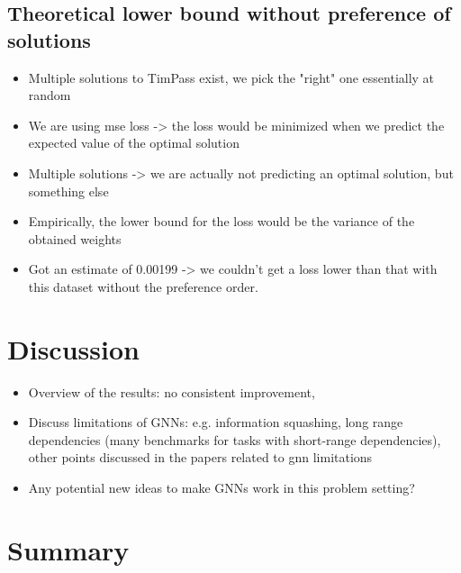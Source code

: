 \documentclass[english, 12pt, a4paper, sci, utf8, a-2b, online]{aaltothesis}
\begin{document}
\subsection{Theoretical lower bound without preference of solutions}
\begin{itemize}
    \item Multiple solutions to TimPass exist, we pick the "right" one essentially at random
    \item We are using mse loss -> the loss would be minimized when we predict the expected value of the optimal solution
    \item Multiple solutions -> we are actually not predicting an optimal solution, but something else
    \item Empirically, the lower bound for the loss would be the variance of the obtained weights
    \item Got an estimate of 0.00199 -> we couldn't get a loss lower than that with this dataset without the preference order.
\end{itemize}


\clearpage
\section{Discussion}
\begin{itemize}
    \item Overview of the results: no consistent improvement, 
    \item Discuss limitations of GNNs: e.g. information squashing, long range dependencies (many benchmarks for tasks with short-range dependencies), other points discussed in the papers related to gnn limitations
    \item Any potential new ideas to make GNNs work in this problem setting?
\end{itemize} 

\clearpage
\section{Summary}
\label{sec:summary}

\clearpage
\thesisbibliography

 
%  



\clearpage
\thesisappendix
\end{document}
